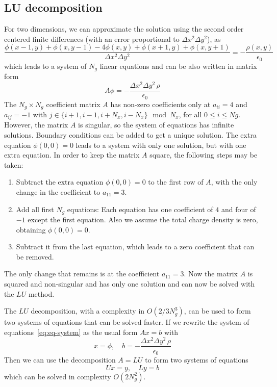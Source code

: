 \subsection{LU decomposition}
%
For two dimensions, we can approximate the solution using the second order 
centered finite differences (with an error proportional to $\Delta x ^2 \Delta 
y^2$), as
%
\begin{equation}%
\label{eq:discrete-poisson}
\frac{\phi(x-1, y) + \phi(x, y-1) - 4\phi(x,y) + \phi(x+1,y)+\phi(x,y+1)}{\Delta 
x ^2 \Delta y^2} = - \frac{\rho(x,y)}{\epsilon_0}
\end{equation}%
%
which leads to a system of $N_g$ linear equations and can be also written in 
matrix form
%
\begin{equation}
\label{eq:eq-system}
A\phi = -\frac{\Delta x ^2 \Delta y^2\,\rho}{\epsilon_0}
\end{equation}
%
The $N_g \times N_g$ coefficient matrix $A$ has non-zero coefficients only at 
$a_{ii} = 4$ and $a_{ij} = -1$ with $j \in \{i+1, i-1, i+N_x, i-N_x\} \mod N_x$, 
for all $0 \le i \le Ng$.
%
However, the matrix $A$ is singular, so the system of equations has infinite 
solutions. Boundary conditions can be added to get a unique solution. The extra 
equation $\phi(0,0) = 0$ leads to a system with only one solution, but with one 
extra equation. In order to keep the matrix $A$ square, the following steps may 
be taken:

\begin{enumerate}
\item Subtract  the extra equation $\phi(0,0) = 0$ to the first row of $A$, with 
the only change in the coefficient to $a_{11} = 3$.

\item Add all first $N_g$ equations: Each equation has one coefficient of $4$ 
and four of $-1$ except the first equation. Also we assume the total charge 
density is zero, obtaining $\phi(0,0) = 0$.

\item Subtract it from the last equation, which leads to a zero coefficient that 
can be removed.
\end{enumerate}
%
The only change that remains is at the coefficient $a_{11} = 3$. Now the matrix 
$A$ is squared and non-singular and has only one solution and can now be solved 
with the $LU$ method.

The $LU$ decomposition, with a complexity in $O(2/3N_g^3)$, can be used to form 
two systems of equations that can be solved faster. If we rewrite the system of 
equations~\ref{eq:eq-system} as the usual form $Ax=b$ with
\begin{equation}
x = \phi,\quad b = -\frac{\Delta x ^2 \Delta y^2\,\rho}{\epsilon_0}
\end{equation}
%
Then we can use the decomposition $A=LU$ to form two systems of equations
%
\begin{equation}
\label{eq:LU-systems}
Ux=y, \quad Ly=b
\end{equation}
%
which can be solved in complexity $O(2N_g^2)$.


